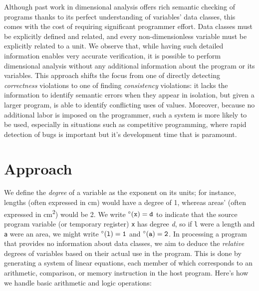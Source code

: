 \documentclass[12pt]{article}
\begin{document}
Although past work in dimensional analysis offers rich semantic checking of programs thanks to its perfect understanding of variables' data classes, this comes with the cost of requiring significant programmer effort.
Data classes must be explicitly defined and related, and every non-dimensionless variable must be explicitly related to a unit.
We observe that, while having such detailed information enables very accurate verification, it is possible to perform dimensional analysis without any additional information about the program or its variables.
This approach shifts the focus from one of directly detecting \textit{correctness} violations to one of finding \textit{consistency} violations: it lacks the information to identify semantic errors when they appear in isolation, but given a larger program, is able to identify conflicting uses of values.
Moreover, because no additional labor is imposed on the programmer, such a system is more likely to be used, especially in situations such as competitive programming, where rapid detection of bugs is important but it's development time that is paramount.

\section{Approach}

We define the \textit{degree} of a variable as the exponent on its units; for instance, lengths (often expressed in cm) would have a degree of 1, whereas areas' (often expressed in cm\textsuperscript{2}) would be 2.
We write $\degree(\tt{x}) = d$ to indicate that the source program variable (or temporary register) \texttt{x} has degree \textit{d}, so if \texttt{l} were a length and \texttt{a} were an area, we might write $\degree(\tt{l}) = 1$ and $\degree(\tt{a}) = 2$.
In processing a program that provides no information about data classes, we aim to deduce the \textit{relative} degrees of variables based on their actual use in the program.
This is done by generating a system of linear equations, each member of which corresponds to an arithmetic, comparison, or memory instruction in the host program.
Here's how we handle basic arithmetic and logic operations:
\\
\end{document}
